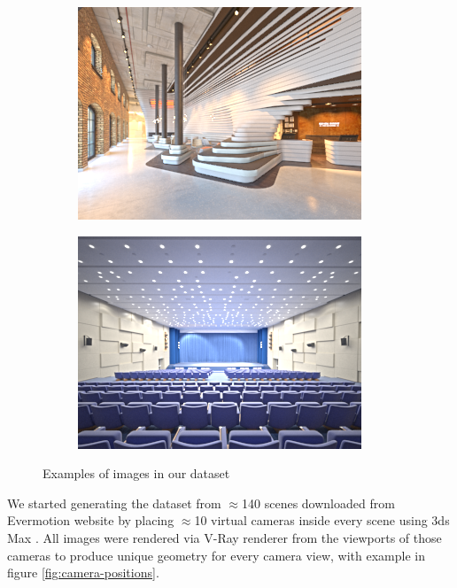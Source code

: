 \begin{figure}
\begin{subfigure}{0.4\linewidth}
    \includegraphics[width=\linewidth]{praca/images/AI44_006_Cam01.png}
  \end{subfigure}
  \begin{subfigure}{0.4\linewidth}
    \includegraphics[width=\linewidth]{praca/images/AI53_005_Cam01.png}
  \end{subfigure}
  \caption[Examples of images in our dataset]{Examples of images in our dataset}
  \label{fig:dataset-examples}
\end{figure}
\newline
We started generating the dataset from $\approx$140 scenes downloaded from Evermotion website \cite{evermotion} by placing $\approx$10 virtual cameras inside every scene using 3ds Max \cite{3ds-max}. All images were rendered via V-Ray renderer \cite{V-Ray} from the viewports of those cameras to produce unique geometry for every camera view, with example in figure \ref{fig:camera-positions}.

